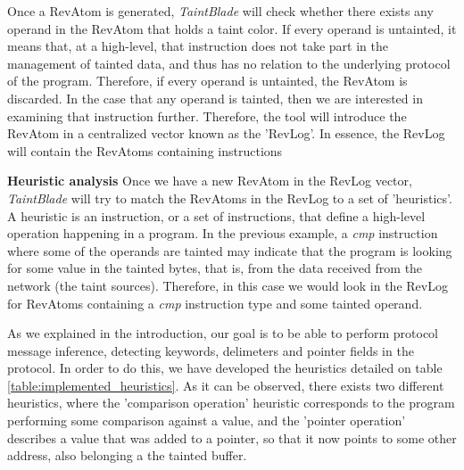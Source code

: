 \documentclass[conference]{IEEEtran}
\begin{document}
Once a RevAtom is generated, \textit{TaintBlade} will check whether there
exists any operand in the RevAtom that holds a taint color. If every operand is
untainted, it means that, at a high-level, that instruction does not take part
in the management of tainted data, and thus has no relation to the underlying
protocol of the program. Therefore, if every operand is untainted, the RevAtom
is discarded. In the case that any operand is tainted, then we are interested
in examining that instruction further. Therefore, the tool will introduce the
RevAtom in a centralized vector known as the 'RevLog'. In essence, the RevLog
will contain the RevAtoms containing instructions

\textbf{Heuristic analysis}
Once we have a new RevAtom in the RevLog vector, \textit{TaintBlade} will try to match the RevAtoms in the RevLog
to a set of 'heuristics'. A heuristic is an instruction, or a set of instructions, that define a high-level
operation happening in a program. In the previous example, a \textit{cmp} instruction where some of the operands
are tainted may indicate that the program is looking for some value in the tainted bytes, that is, from the data
received from the network (the taint sources). Therefore, in this case we would look in the RevLog for RevAtoms
containing a \textit{cmp} instruction type and some tainted operand.

As we explained in the introduction, our goal is to be able to perform protocol
message inference, detecting keywords, delimeters and pointer fields in the
protocol. In order to do this, we have developed the heuristics detailed on
table \ref{table:implemented_heuristics}. As it can be observed, there exists two
different heuristics, where the 'comparison operation' heuristic corresponds to
the program performing some comparison against a value, and the 'pointer operation'
describes a value that was added to a pointer, so that it now points to some other
address, also belonging a the tainted buffer.
\end{document}
